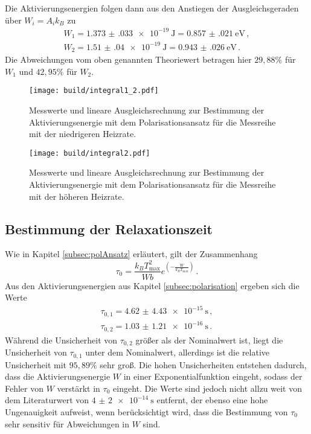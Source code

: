 Die Aktivierungsenergien folgen dann aus den Anstiegen der
Ausgleichsgeraden über $W_i=A_i k_B$ zu
\begin{align*}
	W_1=\SI{1.373(033)e-19}{\joule}=\SI{0.857(021)}{\eV} \,, \\
	W_2=\SI{1.51(04)e-19}{\joule}=\SI{0.943(026)}{\eV} \,.
\end{align*}
Die Abweichungen vom oben genannten Theoriewert betragen hier
$29{,}88\%$ für $W_1$ und $42{,}95\%$ für $W_2$.

\begin{figure}
  \centering
  \texttt{[image: build/integral1\_2.pdf]}
  \caption{Messwerte und lineare Ausgleichsrechnung zur Bestimmung der Aktivierungsenergie mit dem Polarisationsansatz für
  die Messreihe mit der niedrigeren Heizrate.}
  \label{fig:integral1_2}
\end{figure}
\begin{figure}
  \centering
  \texttt{[image: build/integral2.pdf]}
  \caption{Messwerte und lineare Ausgleichsrechnung zur Bestimmung der Aktivierungsenergie mit dem Polarisationsansatz für
  die Messreihe mit der höheren Heizrate.}
  \label{fig:integral2}
\end{figure}

\subsection{Bestimmung der Relaxationszeit}

Wie in Kapitel \ref{subsec:polAnsatz} erläutert, gilt der Zusammenhang
\begin{equation*}
	\tau_0=\frac{k_B T_{\text{max}}^2}{W b} e^{\left(-\frac{W}{k_B T_{\text{max}}}\right)} \,.
\end{equation*}
Aus den Aktivierungsenergien aus Kapitel \ref{subsec:polarisation} ergeben sich die Werte
\begin{align*}
	\tau_{0,1}=\SI{4.62(443)e-15}{\second} \,, \\
	\tau_{0,2}=\SI{1.03(121)e-16}{\second} \,.
\end{align*}
Während die Unsicherheit von $\tau_{0,2}$ größer als der Nominalwert ist, liegt die Unsicherheit von $\tau_{0,1}$ unter dem Nominalwert, allerdings ist die relative Unsicherheit mit $95{,}89\%$ sehr groß.
Die hohen Unsicherheiten entstehen dadurch, dass die Aktivierungsenergie $W$ in einer Exponentialfunktion eingeht, sodass der Fehler von $W$ verstärkt in $\tau_0$ eingeht.
Die Werte sind jedoch nicht allzu weit von dem Literaturwert von $\SI{4(2)e-14}{\second}$ \cite{lit} entfernt, der ebenso eine hohe Ungenauigkeit aufweist, wenn berücksichtigt wird, dass die Bestimmung von $\tau_0$ sehr sensitiv für Abweichungen in $W$ sind.
